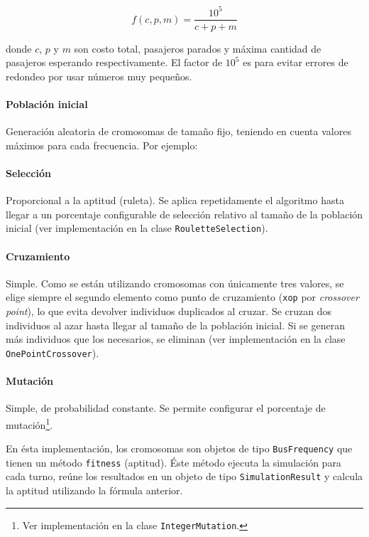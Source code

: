 \documentclass{conaiisi}
\begin{document}
\begin{multicols}{2}
\[ f(c, p, m) = \frac{10^5}{c + p + m} \]

donde $c$, $p$ y $m$ son costo total, pasajeros parados y máxima cantidad de pasajeros esperando respectivamente.
El factor de $10^5$ es para evitar errores de redondeo por usar números muy pequeños.


\paragraph{Población inicial} Generación aleatoria de cromosomas de tamaño fijo, teniendo en cuenta valores máximos para cada frecuencia.
Por ejemplo:



\paragraph{Selección} Proporcional a la aptitud (ruleta). Se aplica repetidamente el algoritmo hasta llegar a un porcentaje configurable de selección relativo al tamaño de la población inicial (ver implementación en la clase \texttt{RouletteSelection}).

\paragraph{Cruzamiento} Simple.
Como se están utilizando cromosomas con únicamente tres valores, se elige siempre el segundo elemento como punto de cruzamiento (\texttt{xop} por \textit{\foreignlanguage{english}{crossover point}}), lo que evita devolver individuos duplicados al cruzar.
Se cruzan dos individuos al azar hasta llegar al tamaño de la población inicial.
Si se generan más individuos que los necesarios, se eliminan (ver implementación en la clase \texttt{OnePointCrossover}).

\paragraph{Mutación} Simple, de probabilidad constante. Se permite configurar el porcentaje de mutación\footnote{Ver implementación en la clase \texttt{IntegerMutation}.}.

En ésta implementación, los cromosomas son objetos de tipo \texttt{BusFrequency} que tienen un método \texttt{fitness} (aptitud).
Éste método ejecuta la simulación para cada turno, reúne los resultados en un objeto de tipo \texttt{SimulationResult} y calcula la aptitud utilizando la fórmula anterior.


\end{multicols}
\end{document}
